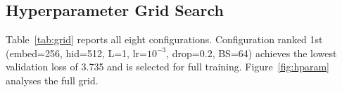 \documentclass[runningheads]{llncs}
\begin{document}
\subsection{Hyperparameter Grid Search}

Table~\ref{tab:grid} reports all eight configurations. Configuration ranked
1st (embed=256, hid=512, L=1, lr=$10^{-3}$, drop=0.2, BS=64) achieves the
lowest validation loss of 3.735 and is selected for full training.
Figure~\ref{fig:hparam} analyses the full grid.

\begin{table}[t]
\centering
\caption{Grid search results ranked by validation loss (8 epochs each).
\colorbox{bestrow}{Highlighted} row is the selected configuration.}
\label{tab:grid}
\end{table}
\end{document}
